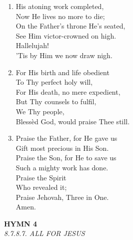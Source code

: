\begin{enumerate}
    \item His atoning work completed, \\
        Now He lives no more to die; \\
        On the Father's throne He's seated, \\
        See Him victor-crowned on high. \\
        Hallelujah! \\
        'Tis by Him we now draw nigh.

    \item For His birth and life obedient \\
        To Thy perfect holy will, \\
        For His death, no mere expedient, \\
        But Thy counsels to fulfil, \\
        We Thy people, \\
        Bless\`ed God, would praise Thee still.

    \item Praise the Father, for He gave us \\
        Gift most precious in His Son. \\
        Praise the Son, for He to save us \\
        Such a mighty work has done. \\
        Praise the Spirit \\
        Who revealed it; \\
        Praise Jehovah, Three in One. \\
        Amen.

\end{enumerate}

\newpage
\begin{center}
    {\Large \textbf{HYMN 4}}
    \\
    \textit{8.7.8.7. ALL FOR JESUS}
\end{center}
\vspace{1em}

